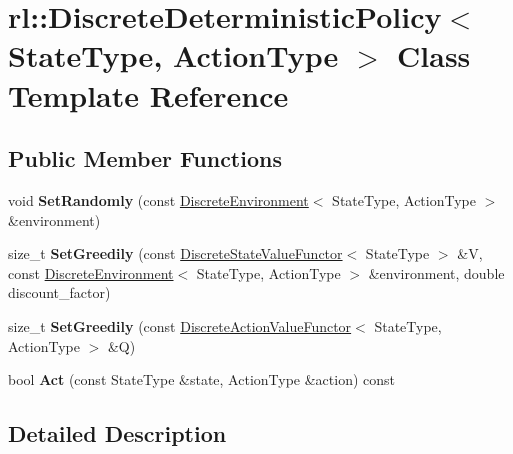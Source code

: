 \hypertarget{classrl_1_1_discrete_deterministic_policy}{}\section{rl\+:\+:Discrete\+Deterministic\+Policy$<$ State\+Type, Action\+Type $>$ Class Template Reference}
\label{classrl_1_1_discrete_deterministic_policy}
\subsection*{Public Member Functions}
\begin{DoxyCompactItemize}
\item 
\hypertarget{classrl_1_1_discrete_deterministic_policy_aa0502bdff3bbe4896d52b50e6fb682f3}{}\label{classrl_1_1_discrete_deterministic_policy_aa0502bdff3bbe4896d52b50e6fb682f3} 
void {\bfseries Set\+Randomly} (const \hyperlink{classrl_1_1_discrete_environment}{Discrete\+Environment}$<$ State\+Type, Action\+Type $>$ \&environment)
\item 
\hypertarget{classrl_1_1_discrete_deterministic_policy_a9391924c1b0ad563aff49dedc80af744}{}\label{classrl_1_1_discrete_deterministic_policy_a9391924c1b0ad563aff49dedc80af744} 
size\+\_\+t {\bfseries Set\+Greedily} (const \hyperlink{structrl_1_1_discrete_state_value_functor}{Discrete\+State\+Value\+Functor}$<$ State\+Type $>$ \&V, const \hyperlink{classrl_1_1_discrete_environment}{Discrete\+Environment}$<$ State\+Type, Action\+Type $>$ \&environment, double discount\+\_\+factor)
\item 
\hypertarget{classrl_1_1_discrete_deterministic_policy_a378029387659936c201d6e7e50d10201}{}\label{classrl_1_1_discrete_deterministic_policy_a378029387659936c201d6e7e50d10201} 
size\+\_\+t {\bfseries Set\+Greedily} (const \hyperlink{structrl_1_1_discrete_action_value_functor}{Discrete\+Action\+Value\+Functor}$<$ State\+Type, Action\+Type $>$ \&Q)
\item 
\hypertarget{classrl_1_1_discrete_deterministic_policy_aa464571566c0a6f97bb7e415fb78a491}{}\label{classrl_1_1_discrete_deterministic_policy_aa464571566c0a6f97bb7e415fb78a491} 
bool {\bfseries Act} (const State\+Type \&state, Action\+Type \&action) const
\end{DoxyCompactItemize}


\subsection{Detailed Description}
